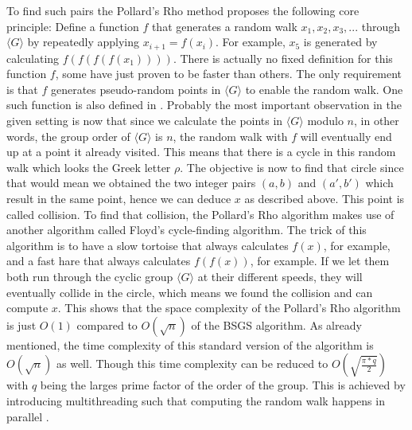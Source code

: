 To find such pairs the Pollard's Rho method proposes the following core principle: Define a function $f$ that generates a random walk $x_1, x_2, x_3, ...$ through $\langle G \rangle$ by repeatedly applying $x_{i + 1} = f(x_i)$. For example, $x_5$ is generated by calculating $f(f(f(f(x_1))))$. There is actually no fixed definition for this function $f$, some have just proven to be faster than others. The only requirement is that $f$ generates pseudo-random points in $\langle G \rangle$ to enable the random walk. One such function is also defined in \cite{article}. Probably the most important observation in the given setting is now that since we calculate the points in $\langle G \rangle$ modulo $n$, in other words, the group order of $\langle G \rangle$ is $n$, the random walk with $f$ will eventually end up at a point it already visited. This means that there is a cycle in this random walk which looks the Greek letter $\rho$. The objective is now to find that circle since that would mean we obtained the two integer pairs $(a, b)$ and $(a', b')$ which result in the same point, hence we can deduce $x$ as described above. This point is called collision. To find that collision, the Pollard's Rho algorithm makes use of another algorithm called Floyd's cycle-finding algorithm. The trick of this algorithm is to have a slow tortoise that always calculates $f(x)$, for example, and a fast hare that always calculates $f(f(x))$, for example. If we let them both run through the cyclic group $\langle G \rangle$ at their different speeds, they will eventually collide in the circle, which means we found the collision and can compute $x$. This shows that the space complexity of the Pollard's Rho algorithm is just $O(1)$ compared to $O(\sqrt{n})$ of the BSGS algorithm. As already mentioned, the time complexity of this standard version of the algorithm is $O(\sqrt{n})$ as well. Though this time complexity can be reduced to $O(\sqrt{\frac{\pi * q}{2}})$ with $q$ being the larges prime factor of the order of the group. This is achieved by introducing multithreading such that computing the random walk happens in parallel \cite{article}.



 
